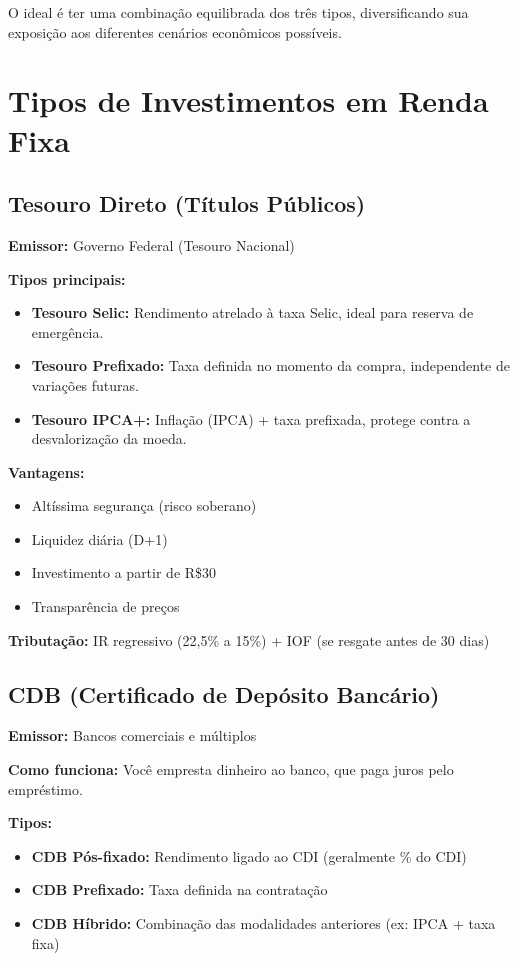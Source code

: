 \vspace{0.5cm}
\noindent O ideal é ter uma combinação equilibrada dos três tipos, diversificando sua exposição aos diferentes cenários econômicos possíveis.
\section{Tipos de Investimentos em Renda Fixa}
\label{sec:tipos-renda-fixa}

\subsection{Tesouro Direto (Títulos Públicos)}
\label{subsec:tesouro-direto}

\textbf{Emissor:} Governo Federal (Tesouro Nacional)

\textbf{Tipos principais:}
\begin{itemize}
    \item \textbf{Tesouro Selic:} Rendimento atrelado à taxa Selic, ideal para reserva de emergência.
    \item \textbf{Tesouro Prefixado:} Taxa definida no momento da compra, independente de variações futuras.
    \item \textbf{Tesouro IPCA+:} Inflação (IPCA) + taxa prefixada, protege contra a desvalorização da moeda.
\end{itemize}

\textbf{Vantagens:}
\begin{itemize}
    \item Altíssima segurança (risco soberano)
    \item Liquidez diária (D+1)
    \item Investimento a partir de R\$30
    \item Transparência de preços
\end{itemize}

\textbf{Tributação:} IR regressivo (22,5\% a 15\%) + IOF (se resgate antes de 30 dias)

\subsection{CDB (Certificado de Depósito Bancário)}
\label{subsec:cdb}

\textbf{Emissor:} Bancos comerciais e múltiplos

\textbf{Como funciona:} Você empresta dinheiro ao banco, que paga juros pelo empréstimo.

\textbf{Tipos:}
\begin{itemize}
    \item \textbf{CDB Pós-fixado:} Rendimento ligado ao CDI (geralmente \% do CDI)
    \item \textbf{CDB Prefixado:} Taxa definida na contratação
    \item \textbf{CDB Híbrido:} Combinação das modalidades anteriores (ex: IPCA + taxa fixa)
\end{itemize}

